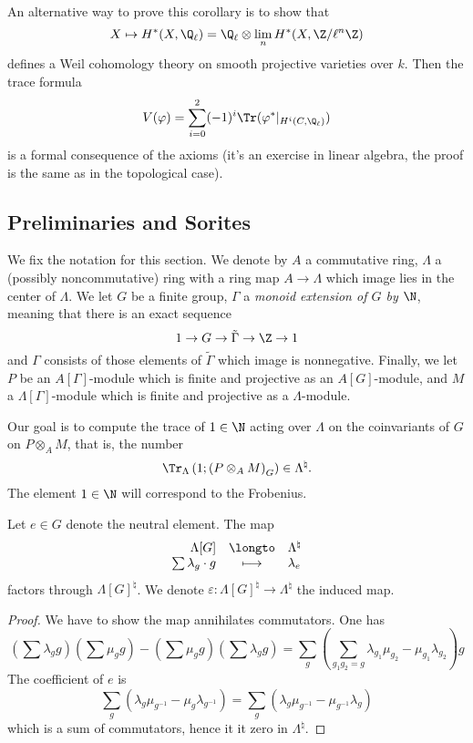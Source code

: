 An alternative way to prove this corollary is to show that 
$$
X \mapsto H^* (X, \Q_\ell) = \Q_\ell \otimes \lim_n H^*(X, \Z/\ell^n\Z)
$$ 
defines a Weil cohomology theory on smooth projective varieties over $k$. Then the trace formula 
$$
V(\varphi) = \sum_{i=0}^2 (-1)^i \Tr(\varphi^* |_{H^i (C,\Q_\ell)})
$$
is a formal consequence of the axioms (it's an exercise in linear algebra, the proof is the same as in the topological case).


\subsection{Preliminaries and Sorites}

\begin{notation}
We fix the notation for this section. We denote by $A$ a commutative ring, $\Lambda$ a (possibly noncommutative) ring with a ring map $A\to \Lambda$ which image lies in the center of $\Lambda$. We let $G$ be a finite group, $\Gamma$ a \emph{monoid extension of $G$ by $\N$}, meaning that there is an exact sequence
$$
1\to G\to \tilde\Gamma\to \Z\to 1
$$
and $\Gamma$ consists of those elements of $\tilde\Gamma$ which image is nonnegative. Finally, we let $P$ be an $A[\Gamma]$-module which is finite and projective as an $A[G]$-module, and $M$ a $\Lambda[\Gamma]$-module which is finite and projective as a $\Lambda$-module.
\end{notation}

Our goal is to compute the trace of $1 \in \N$ acting over $\Lambda$ on the coinvariants of $G$ on $P\otimes_A M$, that is, the number
$$
\Tr_{\Lambda}\left(1; \left(P\otimes_A M\right)_G\right) \in \Lambda^\natural.
$$
The element $1\in \N$ will correspond to the Frobenius.

\begin{lem} 
Let $e\in G$ denote the neutral element. The map
$$\begin{array}{rcl}
\Lambda[G] & \longto & \Lambda^{\natural}\\
\sum \lambda_g\cdot g &\longmapsto& \lambda_e
\end{array}$$
factors through $\Lambda[G]^\natural$. We denote $\varepsilon: \Lambda[G]^\natural\to \Lambda^\natural$ the induced map.
\end{lem}

\begin{proof}
We have to show the map annihilates commutators. One has
$$
\left(\sum\lambda_g g\right)\left(\sum\mu_g g\right)-\left(\sum \mu_g g\right)\left(\sum\lambda_g g\right) 
= \sum_g\left(\sum_{g_1g_2=g} \lambda_{g_1}\mu_{g_2}-\mu_{g_1}\lambda_{g_2}\right)g
$$
The coefficient of $e$ is
$$\sum_g\left(\lambda_g\mu_{g^{-1}}-\mu_g\lambda_{g^{-1}}\right) = \sum_g\left(\lambda_g\mu_{g^{-1}}-\mu_{g^{-1}}\lambda_g\right)$$
which is a sum of commutators, hence it it zero in $\Lambda^\natural$.
\end{proof}

